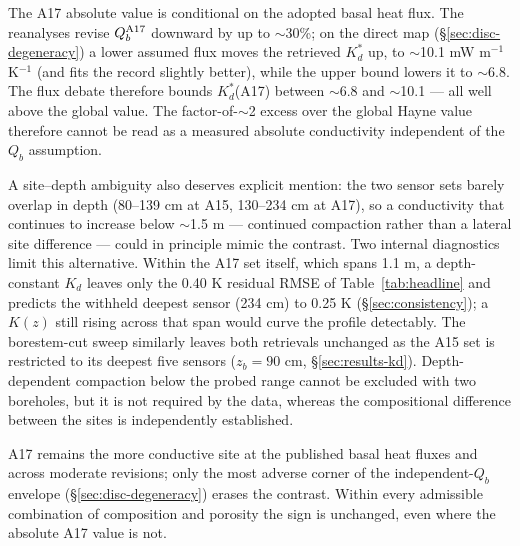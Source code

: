 \documentclass[11pt]{article}
\begin{document}
The A17 absolute value is conditional on the adopted basal heat flux. The
\citet{saito2007,nagihara2018} reanalyses revise $Q_b^{\rm A17}$ downward
by up to $\sim$30\%; on the direct map
(\S\ref{sec:disc-degeneracy}) a lower assumed flux moves the retrieved
$K_d^{*}$ up, to $\sim$10.1 mW m$^{-1}$ K$^{-1}$ (and fits the
record slightly better), while the upper bound lowers it to $\sim$6.8.
The flux debate therefore bounds $K_d^{*}$(A17) between $\sim$6.8 and
$\sim$10.1 --- all well above the global value. The
factor-of-$\sim$2 excess over the global Hayne
value therefore cannot be read
as a measured absolute conductivity independent of the $Q_b$ assumption.

A site--depth ambiguity also deserves explicit mention: the two
sensor sets barely overlap in depth (80--139 cm at A15, 130--234 cm at
A17), so a conductivity that continues to increase below
$\sim$1.5 m --- continued compaction rather than a lateral site
difference --- could in principle mimic the contrast. Two internal
diagnostics limit this alternative. Within the A17 set itself, which
spans 1.1 m, a depth-constant $K_d$ leaves only the 0.40 K residual
RMSE of Table~\ref{tab:headline} and predicts the withheld deepest
sensor (234 cm) to 0.25 K (\S\ref{sec:consistency}); a $K(z)$ still
rising across that span would curve the profile detectably. The
borestem-cut sweep similarly leaves both retrievals unchanged as the
A15 set is restricted to its deepest five sensors ($z_b=90$ cm,
\S\ref{sec:results-kd}). Depth-dependent compaction below the probed
range cannot be excluded with two boreholes, but it is not required by
the data, whereas the compositional difference between the sites is
independently established.

A17 remains the more conductive site at the
published basal heat fluxes and across moderate revisions; only the
most adverse corner of the independent-$Q_b$ envelope
(\S\ref{sec:disc-degeneracy}) erases the contrast. Within every
admissible combination of composition and porosity the sign is
unchanged, even where the absolute A17 value is not.

\FloatBarrier
\end{document}
